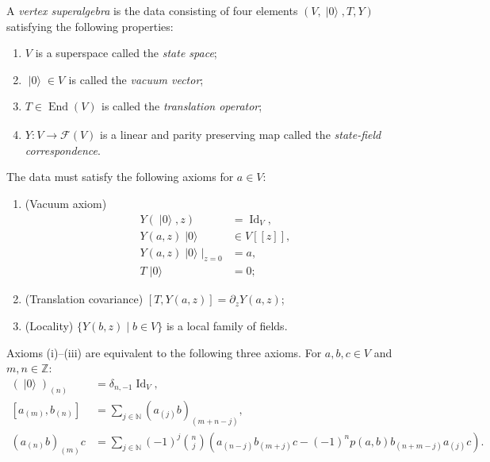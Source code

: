 \documentclass{beamer}
\DeclareMathOperator{\Id}{Id}
\DeclareMathOperator{\End}{End}
\DeclareMathOperator{\vac}{|0\rangle}
\DeclareMathOperator{\zero}{\overline{0}}
\begin{document}
\begin{frame}

  A \emph{vertex superalgebra} is the data consisting of four elements $(V, \vac, T, Y)$ satisfying the following properties:
  \begin{enumerate}
  \item $V$ is a superspace called the \emph{state space};
  \item $\vac \in V_{\zero}$ is called the \emph{vacuum vector};
  \item $T \in \End(V)_{\zero}$ is called the \emph{translation operator};
  \item $Y: V \to \mathcal{F}(V)$ is a linear and parity preserving map called the \emph{state-field correspondence}.
  \end{enumerate}
  The data must satisfy the following axioms for $a \in V$:

\end{frame}

\begin{frame}

  \begin{enumerate}
  \item (Vacuum axiom)
    \begin{align*}
      Y(\vac,z) &= \Id_V, \\
      Y(a, z)\vac &\in V[[z]], \\
      Y(a, z)\vac|_{z = 0} &= a, \\
      T\vac &= 0;
    \end{align*}
  \item (Translation covariance) $[T, Y(a, z)] = \partial_zY(a, z)$;
  \item (Locality) $\{Y(b, z) \mid b \in V\}$ is a local family of fields.
  \end{enumerate}

  Axioms (i)--(iii) are equivalent to the following three axioms.
  For $a, b, c \in V$ and $m, n \in \mathbb{Z}$:
  \begin{align*}
    (\vac)_{(n)} &= \delta_{n, -1}\Id_V, \\
    [a_{(m)}, b_{(n)}] &= \sum_{j \in \mathbb{N}}(a_{(j)}b)_{(m + n - j)}, \\
    (a_{(n)}b)_{(m)}c &= \sum_{j \in \mathbb{N}}(-1)^j\binom{n}{j}(a_{(n - j)}b_{(m + j)}c - (-1)^np(a, b)b_{(n + m - j)}a_{(j)}c).
  \end{align*}

\end{frame}
\end{document}

